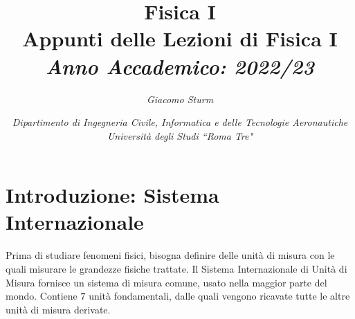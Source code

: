 \documentclass{article}
\numberwithin{equation}{subsection}
\begin{document}
\title{%
    \textbf{Fisica I}  \\ 
    \large Appunti delle Lezioni di Fisica I\\
    \textit{Anno Accademico: 2022/23}}
\author{\textit{Giacomo Sturm}}
\date{\textit{Dipartimento di Ingegneria Civile, Informatica e delle Tecnologie Aeronautiche \\
Università degli Studi ``Roma Tre"}}

\maketitle
\thispagestyle{link}

\clearpage


\pagestyle{fancy}
\fancyhead{}\fancyfoot{}
\fancyfoot[C]{\thepage}

\tableofcontents

\clearpage



\section{Introduzione: Sistema Internazionale}

Prima di studiare fenomeni fisici, bisogna definire delle unità di misura con le quali misurare le grandezze fisiche trattate. Il Sistema Internazionale 
di Unità di Misura fornisce un sistema di misura comune, usato nella maggior parte del mondo. Contiene $7$ unità fondamentali, dalle quali vengono 
ricavate tutte le altre unità di misura derivate. 
\end{document}
